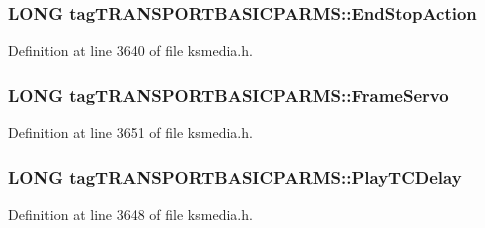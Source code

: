 \subsubsection[{\texorpdfstring{End\+Stop\+Action}{EndStopAction}}]{\setlength{\rightskip}{0pt plus 5cm}L\+O\+NG tag\+T\+R\+A\+N\+S\+P\+O\+R\+T\+B\+A\+S\+I\+C\+P\+A\+R\+M\+S\+::\+End\+Stop\+Action}\hypertarget{structtag_t_r_a_n_s_p_o_r_t_b_a_s_i_c_p_a_r_m_s_af7ee74924edc860b5318da2826fb0a86}{}\label{structtag_t_r_a_n_s_p_o_r_t_b_a_s_i_c_p_a_r_m_s_af7ee74924edc860b5318da2826fb0a86}


Definition at line 3640 of file ksmedia.\+h.

\subsubsection[{\texorpdfstring{Frame\+Servo}{FrameServo}}]{\setlength{\rightskip}{0pt plus 5cm}L\+O\+NG tag\+T\+R\+A\+N\+S\+P\+O\+R\+T\+B\+A\+S\+I\+C\+P\+A\+R\+M\+S\+::\+Frame\+Servo}\hypertarget{structtag_t_r_a_n_s_p_o_r_t_b_a_s_i_c_p_a_r_m_s_a72933d3d5433e37f0c4996096c44830b}{}\label{structtag_t_r_a_n_s_p_o_r_t_b_a_s_i_c_p_a_r_m_s_a72933d3d5433e37f0c4996096c44830b}


Definition at line 3651 of file ksmedia.\+h.

\subsubsection[{\texorpdfstring{Play\+T\+C\+Delay}{PlayTCDelay}}]{\setlength{\rightskip}{0pt plus 5cm}L\+O\+NG tag\+T\+R\+A\+N\+S\+P\+O\+R\+T\+B\+A\+S\+I\+C\+P\+A\+R\+M\+S\+::\+Play\+T\+C\+Delay}\hypertarget{structtag_t_r_a_n_s_p_o_r_t_b_a_s_i_c_p_a_r_m_s_a3f44b40383ee3e92fe772d884a44e3c9}{}\label{structtag_t_r_a_n_s_p_o_r_t_b_a_s_i_c_p_a_r_m_s_a3f44b40383ee3e92fe772d884a44e3c9}


Definition at line 3648 of file ksmedia.\+h.

